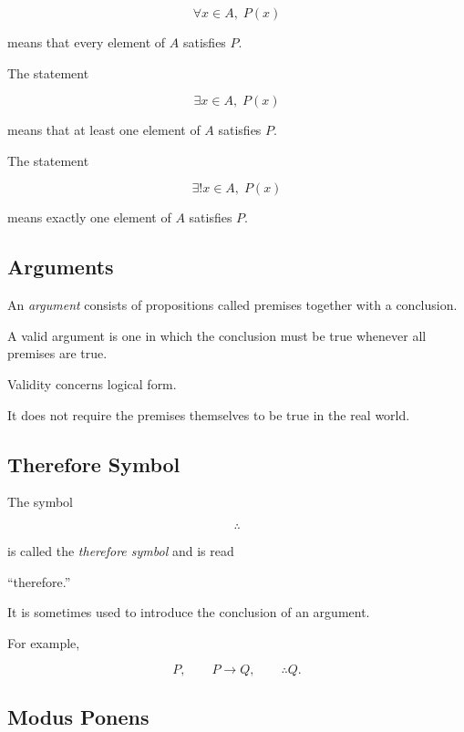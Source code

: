 \[ \forall x\in A,\;P(x) \]

means that every element of \(A\) satisfies \(P\).

The statement

\[ \exists x\in A,\;P(x) \]

means that at least one element of \(A\) satisfies \(P\).

The statement

\[ \exists!x\in A,\;P(x) \]

means exactly one element of \(A\) satisfies \(P\).

\subsection{Arguments}
\label{subsec:logical-arguments}

An \emph{argument} consists of propositions called premises together with a
conclusion.

A valid argument is one in which the conclusion must be true whenever all
premises are true.

Validity concerns logical form.

It does not require the premises themselves to be true in the real world.

\subsection{Therefore Symbol}
\label{subsec:therefore-symbol}

The symbol

\[ \therefore \]

is called the \emph{therefore symbol} and is read

\begin{center}
``therefore.''
\end{center}

It is sometimes used to introduce the conclusion of an argument.

For example,

\[ P,\qquad P\to Q,\qquad \therefore Q. \]

\subsection{Modus Ponens}
\label{subsec:modus-ponens}

